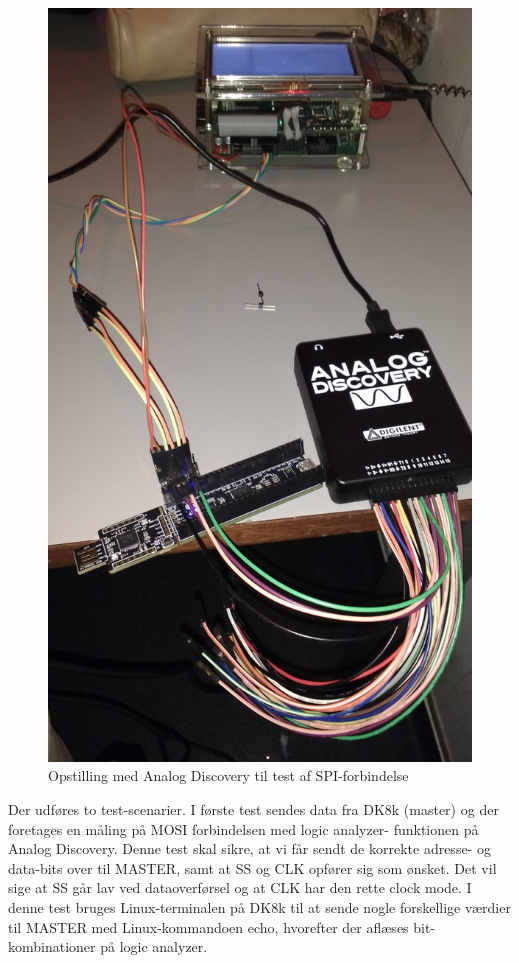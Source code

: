 \begin{figure}[H]
	\centering
\includegraphics[scale=0.1]{Screenshots/Test_analog}
\caption{Opstilling med Analog Discovery til test af SPI-forbindelse} 
\end{figure}

Der udføres to test-scenarier. I første test sendes data fra DK8k (master) og der foretages en måling på MOSI forbindelsen med logic analyzer-
funktionen på Analog Discovery. Denne test skal sikre, at vi får sendt de korrekte adresse- og data-bits over til MASTER, samt at SS og CLK opfører sig 
som ønsket. Det vil sige at SS går lav ved dataoverførsel og at CLK har den rette clock mode. I denne test bruges Linux-terminalen på DK8k til at sende nogle 
forskellige værdier til MASTER med Linux-kommandoen echo, hvorefter der aflæses bit-kombinationer på logic analyzer.

